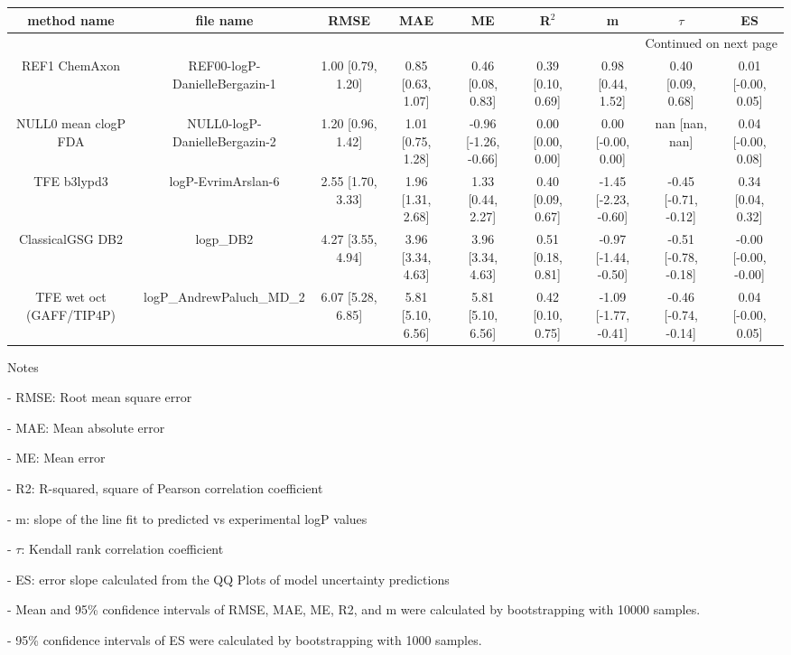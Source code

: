 \documentclass{article}
\begin{document}
\begin{center}
\scriptsize
\begin{longtable}{|ccccccccc|}
\toprule
              method name &                      file name &               RMSE &                MAE &                    ME &              R$^2$ &                     m &                $\tau$ &                    ES \\
\midrule
\endhead
\midrule
\multicolumn{9}{r}{{Continued on next page}} \\
\midrule
\endfoot

\bottomrule
\endlastfoot
            REF1 ChemAxon &  REF00-logP-DanielleBergazin-1 &  1.00 [0.79, 1.20] &  0.85 [0.63, 1.07] &     0.46 [0.08, 0.83] &  0.39 [0.10, 0.69] &     0.98 [0.44, 1.52] &     0.40 [0.09, 0.68] &    0.01 [-0.00, 0.05] \\
     NULL0 mean clogP FDA &  NULL0-logP-DanielleBergazin-2 &  1.20 [0.96, 1.42] &  1.01 [0.75, 1.28] &  -0.96 [-1.26, -0.66] &  0.00 [0.00, 0.00] &    0.00 [-0.00, 0.00] &        nan [nan, nan] &    0.04 [-0.00, 0.08] \\
              TFE b3lypd3 &             logP-EvrimArslan-6 &  2.55 [1.70, 3.33] &  1.96 [1.31, 2.68] &     1.33 [0.44, 2.27] &  0.40 [0.09, 0.67] &  -1.45 [-2.23, -0.60] &  -0.45 [-0.71, -0.12] &     0.34 [0.04, 0.32] \\
         ClassicalGSG DB2 &                      logp\_DB2 &  4.27 [3.55, 4.94] &  3.96 [3.34, 4.63] &     3.96 [3.34, 4.63] &  0.51 [0.18, 0.81] &  -0.97 [-1.44, -0.50] &  -0.51 [-0.78, -0.18] &  -0.00 [-0.00, -0.00] \\
 TFE wet oct (GAFF/TIP4P) &      logP\_AndrewPaluch\_MD\_2 &  6.07 [5.28, 6.85] &  5.81 [5.10, 6.56] &     5.81 [5.10, 6.56] &  0.42 [0.10, 0.75] &  -1.09 [-1.77, -0.41] &  -0.46 [-0.74, -0.14] &    0.04 [-0.00, 0.05] \\
\end{longtable}
\end{center}

Notes

- RMSE: Root mean square error

- MAE: Mean absolute error

- ME: Mean error

- R2: R-squared, square of Pearson correlation coefficient

- m: slope of the line fit to predicted vs experimental logP values

- $\tau$:  Kendall rank correlation coefficient

- ES: error slope calculated from the QQ Plots of model uncertainty predictions

- Mean and 95\% confidence intervals of RMSE, MAE, ME, R2, and m were calculated by bootstrapping with 10000 samples.

- 95\% confidence intervals of ES were calculated by bootstrapping with 1000 samples.\end{document}
\end{document}
